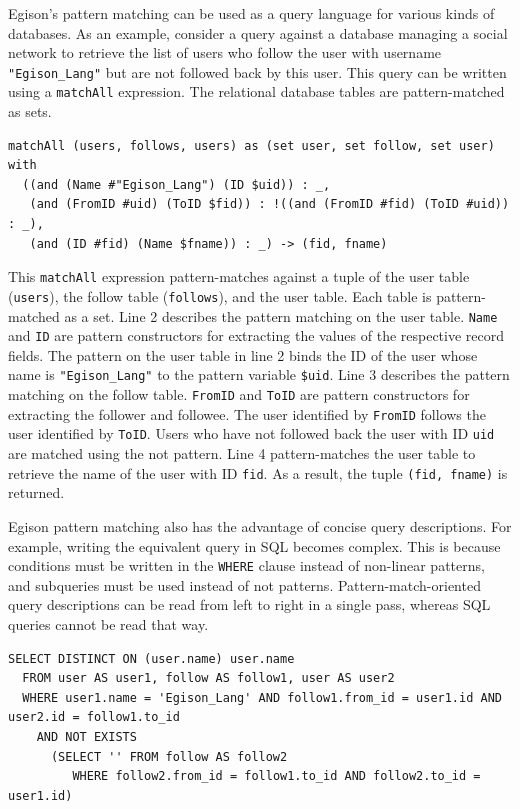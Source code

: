 Egison's pattern matching can be used as a query language for various kinds of databases.
As an example, consider a query against a database managing a social network to retrieve the list of users who follow the user with username \lstinline|"Egison_Lang"| but are not followed back by this user.
This query can be written using a \lstinline{matchAll} expression.
The relational database tables are pattern-matched as sets.
\begin{lstlisting}[language=egison]
matchAll (users, follows, users) as (set user, set follow, set user) with
  ((and (Name #"Egison_Lang") (ID $uid)) : _,
   (and (FromID #uid) (ToID $fid)) : !((and (FromID #fid) (ToID #uid)) : _),
   (and (ID #fid) (Name $fname)) : _) -> (fid, fname)
\end{lstlisting}
This \lstinline{matchAll} expression pattern-matches against a tuple of the user table (\lstinline{users}), the follow table (\lstinline{follows}), and the user table.
Each table is pattern-matched as a set.
Line 2 describes the pattern matching on the user table.
\lstinline{Name} and \lstinline{ID} are pattern constructors for extracting the values of the respective record fields.
The pattern on the user table in line 2 binds the ID of the user whose name is \lstinline{"Egison_Lang"} to the pattern variable \lstinline{$uid}.
Line 3 describes the pattern matching on the follow table.
\lstinline{FromID} and \lstinline{ToID} are pattern constructors for extracting the follower and followee.
The user identified by \lstinline{FromID} follows the user identified by \lstinline{ToID}.
Users who have not followed back the user with ID \lstinline{uid} are matched using the not pattern.
Line 4 pattern-matches the user table to retrieve the name of the user with ID \lstinline{fid}.
As a result, the tuple \lstinline{(fid, fname)} is returned.

Egison pattern matching also has the advantage of concise query descriptions.
For example, writing the equivalent query in SQL becomes complex.
This is because conditions must be written in the \lstinline{WHERE} clause instead of non-linear patterns, and subqueries must be used instead of not patterns.
Pattern-match-oriented query descriptions can be read from left to right in a single pass, whereas SQL queries cannot be read that way.
\begin{lstlisting}[language=egison]
SELECT DISTINCT ON (user.name) user.name
  FROM user AS user1, follow AS follow1, user AS user2
  WHERE user1.name = 'Egison_Lang' AND follow1.from_id = user1.id AND user2.id = follow1.to_id
    AND NOT EXISTS
      (SELECT '' FROM follow AS follow2
         WHERE follow2.from_id = follow1.to_id AND follow2.to_id = user1.id)
\end{lstlisting}


